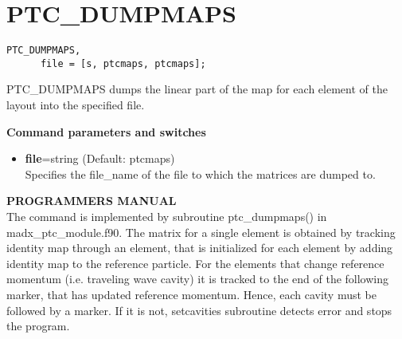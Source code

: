 
\section{PTC\_DUMPMAPS}

\begin{verbatim}
PTC_DUMPMAPS, 
      file = [s, ptcmaps, ptcmaps];
\end{verbatim}

PTC\_DUMPMAPS dumps the linear part of the map for each element of the
layout into the specified file.  

{\bf Command parameters and switches}\\
\begin{itemize}
   \item {\bf file}=string  (Default: ptcmaps)\\
     Specifies the file\_name of the file to which the matrices are dumped to.   
\end{itemize}

{\bf PROGRAMMERS MANUAL} \\  
The command is implemented by subroutine ptc\_dumpmaps() in
madx\_ptc\_module.f90. The matrix for a single element is obtained by
tracking identity map through an element, that is initialized for each
element by adding identity map to the reference particle. For the
elements that change reference momentum (i.e. traveling wave cavity)  it
is tracked to the end of the following marker, that has updated
reference momentum. Hence, each cavity must be followed by a marker. If
it is not, setcavities subroutine detects error and stops the program.   
 
